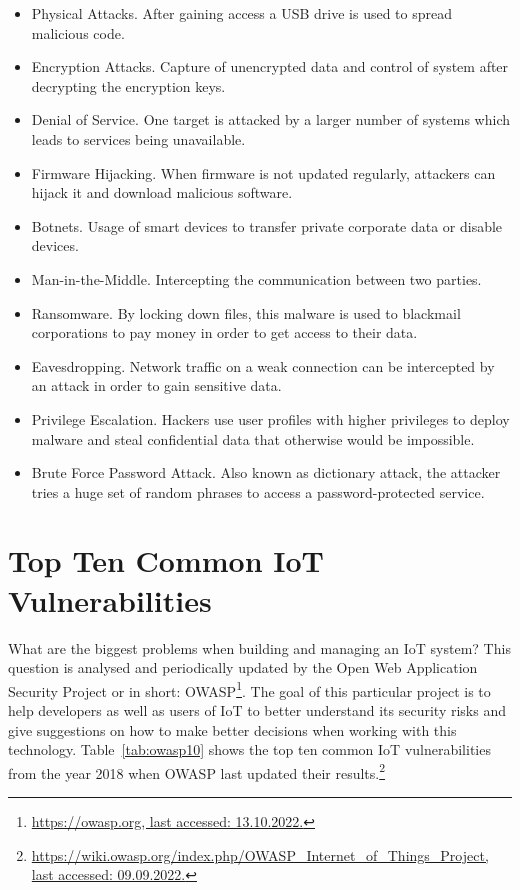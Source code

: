 \begin{itemize}
	\item Physical Attacks. After gaining access a USB drive is used to spread malicious code.
	\item Encryption Attacks. Capture of unencrypted data and control of system after decrypting the encryption keys.
	\item Denial of Service. One target is attacked by a larger number of systems which leads to services being unavailable.
	\item Firmware Hijacking. When firmware is not updated regularly, attackers can hijack it and download malicious software.
	\item Botnets. Usage of smart devices to transfer private corporate data or disable devices.
	\item Man-in-the-Middle. Intercepting the communication between two parties.
	\item Ransomware. By locking down files, this malware is used to blackmail corporations to pay money in order to get access to their data.
	\item Eavesdropping. Network traffic on a weak connection can be intercepted by an attack in order to gain sensitive data.
	\item Privilege Escalation. Hackers use user profiles with higher privileges to deploy malware and steal confidential data that otherwise would be impossible.
	\item Brute Force Password Attack. Also known as dictionary attack, the attacker tries a huge set of random phrases to access a password-protected service. 
\end{itemize} 


\section{Top Ten Common IoT Vulnerabilities}\label{sec:owasp}
What are the biggest problems when building and managing an IoT system? This question is analysed and periodically updated by the Open Web Application Security Project or in short: OWASP\footnote{\href{https://owasp.org}{https://owasp.org, last accessed: 13.10.2022.}}. The goal of this particular project is to help developers as well as users of IoT to better understand its security risks and give suggestions on how to make better decisions when working with this technology. Table~\ref{tab:owasp10} shows the top ten common IoT vulnerabilities from the year 2018 when OWASP last updated their results.\footnote{\href{https://wiki.owasp.org/index.php/OWASP_Internet_of_Things_Project}{https://wiki.owasp.org/index.php/OWASP\_Internet\_of\_Things\_Project, last accessed: 09.09.2022.}}

